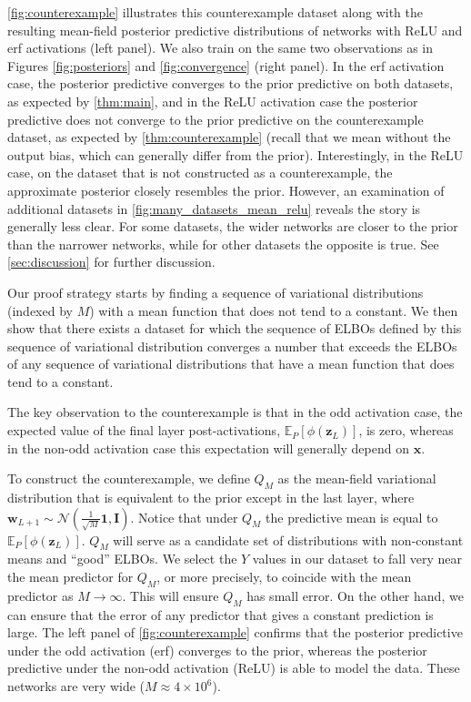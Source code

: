 \documentclass[twoside]{article}
\newcommand{\vw}{\mathbf{w}}
\newcommand{\vx}{\mathbf{x}}
\newcommand{\vz}{\mathbf{z}}
\newcommand{\mI}{\mathbf{I}}
\newcommand{\E}{\mathbb{E}}
\renewcommand{\P}{\mathbb{P}}
\renewcommand{\P}{\ensuremath{P}}
\newcommand{\Normal}{\mathcal{N}}
\theoremstyle{theoremstyle}
\begin{document}
\cref{fig:counterexample} illustrates this counterexample dataset along with the resulting mean-field posterior predictive distributions of networks with ReLU and erf activations (left panel). We also train on the same two observations as in Figures \ref{fig:posteriors} and \ref{fig:convergence} (right panel). In the erf activation case, the posterior predictive converges to the prior predictive on both datasets, as expected by \cref{thm:main}, and in the ReLU activation case the posterior predictive does not converge to the prior predictive on the counterexample dataset, as expected by \cref{thm:counterexample} (recall that we mean without the output bias, which can generally differ from the prior). Interestingly, in the ReLU case, on the dataset that is not constructed as a counterexample, the approximate posterior closely resembles the prior. However, an examination of additional datasets in \cref{fig:many_datasets_mean_relu} reveals the story is generally less clear. For some datasets, the wider networks are closer to the prior than the narrower networks, while for other datasets the opposite is true. See \cref{sec:discussion} for further discussion.

Our proof strategy starts by finding a sequence of variational distributions (indexed by $M$) with a mean function that does not tend to a constant. We then show that there exists a dataset for which the sequence of ELBOs defined by this sequence of variational distribution converges a number that exceeds the ELBOs of any sequence of variational distributions that have a mean function that does tend to a constant. 

The key observation to the counterexample is that in the odd activation case, the expected value of the final layer post-activations, $\E_{\P}[\phi(\vz_L)]$, is zero, whereas in the non-odd activation case this expectation will generally depend on $\vx$. 

To construct the counterexample, we define $Q_M$ as the mean-field variational distribution that is equivalent to the prior except in the last layer, where $\vw_{L+1}\sim \Normal(\tfrac{1}{\sqrt{M}}\mathbf{1},\mI)$. Notice that under $Q_M$ the predictive mean is equal to $\E_{\P}[\phi(\vz_L)]$. $Q_M$ will serve as a candidate set of distributions with non-constant means and ``good'' ELBOs. 
We select the $Y$ values in our dataset to fall very near the mean predictor for $Q_M$, or more precisely, to coincide with the mean predictor as $M \to \infty$. This will ensure $Q_M$ has small error. On the other hand, we can ensure that the error of any predictor that gives a constant prediction is large. The left panel of \cref{fig:counterexample} confirms that the posterior predictive under the odd activation (erf) converges to the prior, whereas the posterior predictive under the non-odd activation (ReLU) is able to model the data. These networks are very wide ($M \approx 4 \times 10^6$).
\end{document}
